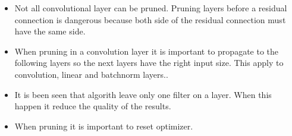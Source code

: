 \documentclass[25pt, a0paper,
               colspace=15mm, subcolspace=0mm,
               blockverticalspace=17mm, margin=1in, total={35in, 44in},
               landscape]{tikzposter} %
\begin{document}
\begin{columns}
  {
  	\begin{itemize}
   \item Not all convolutional layer can be pruned. Pruning layers before a residual connection is dangerous because both side of the residual connection must have the same side.
  \item When pruning in a convolution layer it is important to propagate to the following layers so the next layers have the right input size. This apply to convolution, linear and batchnorm layers..
  \item It is been seen that algorith leave only one filter on a layer. When this happen it reduce the quality of the results.
  \item When pruning it is important to reset optimizer.
  \end{itemize}
\vspace{0.5cm}
  }

\end{columns}
\end{document}
